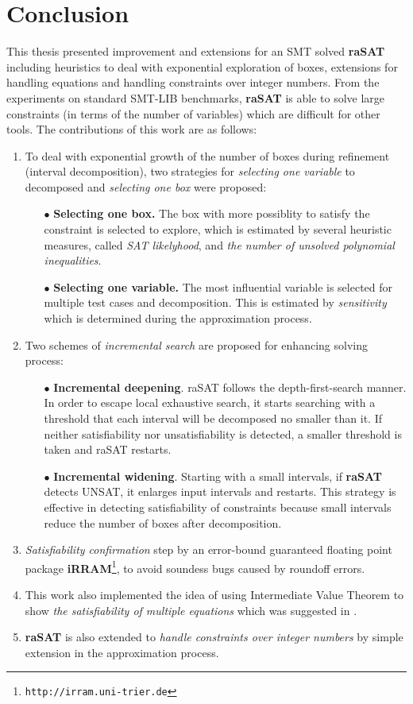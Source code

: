 \chapter{Conclusion} \label{chap:conclusion}


This thesis presented improvement and extensions for an SMT solved {\bf raSAT} including heuristics to deal with exponential exploration of boxes, extensions for handling equations and handling constraints over integer numbers. From the experiments on standard SMT-LIB benchmarks, \textbf{raSAT} is able to solve large constraints (in terms of the number of variables) which are difficult for other tools.
The contributions of this work are as follows:
\begin{enumerate}
\item To deal with exponential growth of the number of boxes during refinement (interval decomposition), two strategies for \emph{selecting one variable} to decomposed and \emph{selecting one box} were proposed:
\begin{itemize}
\item[$\bullet$] \textbf{Selecting one box.} The box with more possiblity to satisfy the constraint is selected to explore, which is estimated by 
several heuristic measures, called {\em SAT likelyhood}, 
and \emph{the number of unsolved polynomial inequalities}.
\item[$\bullet$] \textbf{Selecting one variable.} The most influential variable is selected for multiple test cases and decomposition. 
This is estimated by {\em sensitivity} which is determined during the approximation process.
\end{itemize}
\item Two schemes of \emph{incremental search} are proposed for enhancing solving process: 
\begin{itemize} 
\item[$\bullet$] {\bf Incremental deepening}. 
raSAT follows the depth-first-search manner. In order to escape local exhaustive search, it starts searching with a threshold that each interval will be decomposed no smaller than it. 
If neither satisfiability nor unsatisfiability is detected, a smaller threshold is taken and raSAT restarts. 
\item[$\bullet$] {\bf Incremental widening}. 
Starting with a small intervals, if \textbf{raSAT} detects UNSAT, it enlarges input intervals and restarts. This strategy is effective in detecting satisfiability of constraints because small intervals reduce the number of boxes after decomposition.
\end{itemize}
\item \emph{Satisfiability confirmation} step by an error-bound guaranteed floating point package {\bf iRRAM}\footnote{%
\tt http://irram.uni-trier.de}, to avoid soundess bugs caused by roundoff errors.
\item This work also implemented the idea of using Intermediate Value Theorem to show \emph{the satisfiability of multiple equations} which was suggested in \cite{VanKhanh201227}.
\item \textbf{raSAT} is also extended to \emph{handle constraints over integer numbers} by simple extension in the approximation process.
\end{enumerate}


